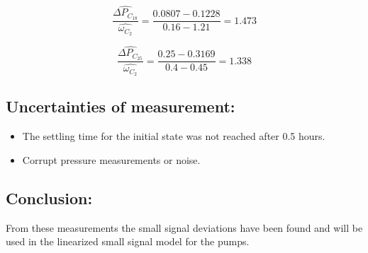 \begin{equation}
\frac{\hat{\Delta P_{C_18}}}{\hat{\omega_{C_2}}} = \frac{0.0807 - 0.1228}{0.16 - 1.21} = 1.473 
\label{eq:smallsig_diff_pres3}
\end{equation}

\begin{equation}
\frac{\hat{\Delta P_{C_25}}}{\hat{\omega_{C_2}}} = \frac{0.25 - 0.3169}{0.4-0.45} = 1.338
\label{eq:smallsig_diff_pres4}
\end{equation}


\subsection*{Uncertainties of measurement:}
\begin{itemize}
\item The settling time for the initial state was not reached after 0.5 hours.
\item Corrupt pressure measurements or noise. 
\end{itemize}

\subsection*{Conclusion:}
From these measurements the small signal deviations have been found and will be used in the linearized small signal model for the pumps. 


